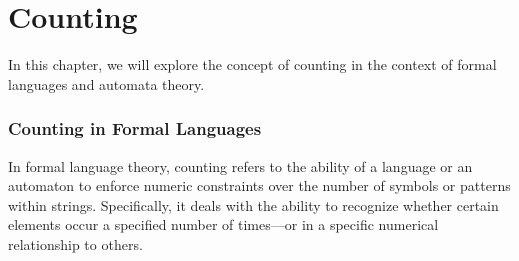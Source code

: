 \chapter{Counting}\label{chap:counting}
In this chapter, we will explore the concept of counting in the context of formal languages and automata theory.

\subsection{Counting in Formal Languages}
In formal language theory, counting refers to the ability of a language or an automaton to enforce numeric constraints over the number of symbols or patterns within strings. Specifically, it deals with the ability to recognize whether certain elements occur a specified number of times—or in a specific numerical relationship to others.